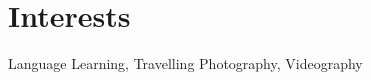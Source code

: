 \section{Interests}

\begin{itemize}
    \cventryii
        {Language Learning, Travelling}
        {}
    \cventryii
        {Photography, Videography}
        {}
\end{itemize}
